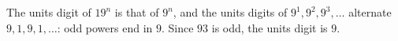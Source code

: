 The units digit of $19^n$ is that of $9^n$, and the units digits of $9^1,9^2,9^3,\ldots$ alternate $9,1,9,1,\ldots$: odd powers end in $9$. Since $93$ is odd, the units digit is $\boxed{9}$.
